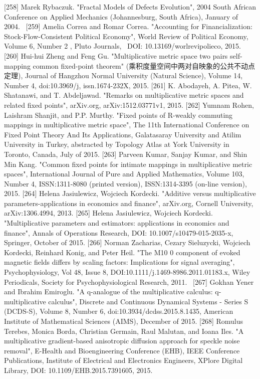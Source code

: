 \documentclass[12pt]{article}
\begin{document}
[258] Marek Rybaczuk. "Fractal Models of Defects Evolution", 2004 South African Conference on Applied Mechanics (Johannesburg, South Africa), January of 2004. 
[259] Amelia Correa and Romar Correa. "Accounting for Financialization: Stock-Flow-Consistent Political Economy", World Review of Political Economy, Volume 6, Number 2 , Pluto Journals,  DOI: 10.13169/worlrevipolieco, 2015.
[260] Hui-hui Zheng and Feng Gu. "Multiplicative metric space two pairs self-mapping common fixed-point theorem" (乘积度量空间中两对自映象的公共不动点定理), Journal of Hangzhou Normal University (Natural Science), Volume 14, Number 4, doi:10.3969/j, issn.1674-232X, 2015.
[261] K. Abodayeh, A. Pitea, W. Shatanawi, and T. Abdeljawad. "Remarks on multiplicative metric spaces and related fixed points", arXiv.org, arXiv:1512.03771v1, 2015.
[262] Yumnam Rohen, Laishram Shanjit, and P.P. Murthy. "Fixed points of R-weakly commuting mappings in multiplicative metric space", The 11th International Conference on Fixed Point Theory And Its Applications, Galatasaray University and Atilim University in Turkey, abstracted by Topology Atlas at York University in Toronto, Canada, July of 2015.
[263] Parveen Kumar, Sanjay Kumar, and Shin Min Kang. "Common fixed points for intimate mappings in multiplicative metric spaces", International Journal of Pure and Applied Mathematics, Volume 103, Number 4, ISSN:1311-8080 (printed version), ISSN:1314-3395 (on-line version), 2015.
[264] Helena Jasiulewicz, Wojciech Kordecki. "Additive versus multiplicative parameters-applications in economics and finance", arXiv.org, Cornell University, arXiv:1306.4994, 2013.
[265] Helena Jasiulewicz, Wojciech Kordecki. "Multiplicative parameters and estimators: applications in economics and finance", Annals of Operations Research, DOI: 10.1007/s10479-015-2035-x, Springer, October of 2015.
[266] Norman Zacharias, Cezary Sieluzycki, Wojciech Kordecki, Reinhard Konig, and Peter Heil. "The M10 0 component of evoked magnetic ﬁelds differs by scaling factors: Implications for signal averaging", Psychophysiology, Vol 48, Issue 8, DOI:10.1111/j.1469-8986.2011.01183.x, Wiley Periodicals, Society for Psychophysiological Research, 2011. 
[267] Gokhan Yener and Ibrahim Emiroglu. "A q-analogue of the multiplicative calculus: q-multiplicative calculus", Discrete and Continuous Dynamical Systems - Series S (DCDS-S), Volume 8, Number 6, doi:10.3934/dcdss.2015.8.1435, American Institute of Mathematical Sciences (AIMS), December of 2015.
[268] Romulus Terebes, Monica Borda, Christian Germain, Raul Malutan, and Ioana Iles. "A multiplicative gradient-based anisotropic diffusion approach for speckle noise removal", E-Health and Bioengineering Conference (EHB), IEEE Conference Publications, Institute of Electrical and Electronics Engineers, XPlore Digital Library, DOI: 10.1109/EHB.2015.7391605, 2015.
\end{document}
